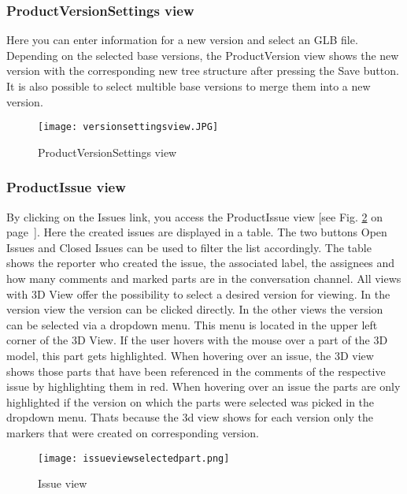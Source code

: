     \subsubsection*{ProductVersionSettings view}
    Here you can enter information for a new version and select an GLB file. Depending on the selected base versions, the ProductVersion view shows the new version with the corresponding new tree structure after pressing the Save button. It is also possible to select multible base versions to merge them into a new version.

    \begin{figure}[h]
        \centering
        \texttt{[image: versionsettingsview.JPG]}
        \caption{ProductVersionSettings view}
        \label{fig: versionsettingsview}
    \end{figure}

    \subsubsection*{ProductIssue view}
    By clicking on the Issues link, you access the ProductIssue view [see Fig. \ref{fig: issueview} on page~\pageref{fig: issueview}]. Here the created issues are displayed in a table. The two buttons Open Issues and Closed Issues can be used to filter the list accordingly. The table shows the reporter who created the issue, the associated label, the assignees and how many comments and marked parts are in the conversation channel. 
    All views with 3D View offer the possibility to select a desired version for viewing. In the version view the version can be clicked directly. In the other views the version can be selected via a dropdown menu. This menu is located in the upper left corner of the 3D View. 
    If the user hovers with the mouse over a part of the 3D model, this part gets highlighted. 
    When hovering over an issue, the 3D view shows those parts that have been referenced in the comments of the respective issue by highlighting them in red.
    When hovering over an issue the parts are only highlighted if the version on which the parts were selected was picked in the dropdown menu. Thats because the 3d view shows for each version only the markers that were created on corresponding version.

    \begin{figure}[h]
        \centering
        \texttt{[image: issueviewselectedpart.png]}
        \caption{Issue view}
        \label{fig: issueview}
    \end{figure}

